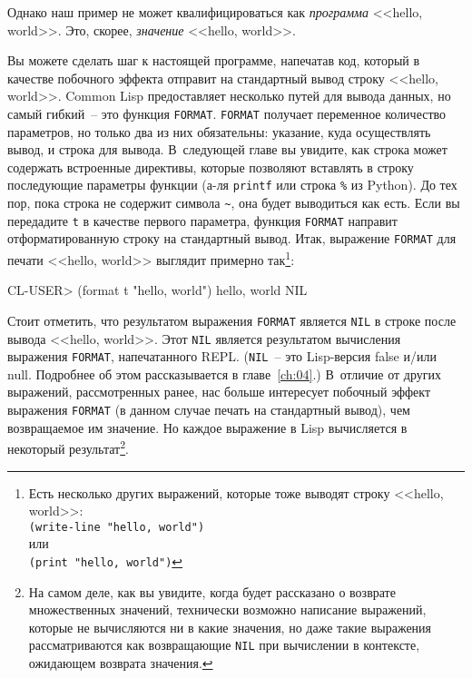 Однако наш пример не может квалифицироваться как \emph{программа} <<hello, world>>.
Это, скорее, \emph{значение} <<hello, world>>.

Вы можете сделать шаг к настоящей программе, напечатав код, который в качестве побочного
эффекта отправит на стандартный вывод строку <<hello, world>>. Common Lisp предоставляет
несколько путей для вывода данных, но самый гибкий~-- это функция \lstinline{FORMAT}. \lstinline{FORMAT} получает
переменное количество параметров, но только два из них обязательны: указание, куда
осуществлять вывод, и строка для вывода. В~следующей главе вы увидите, как строка может
содержать встроенные директивы, которые позволяют вставлять в строку последующие параметры
функции (а-ля \lstinline{printf} или строка \lstinline|%| из Python). До тех пор, пока строка
не содержит символа \lstinline|~|, она будет выводиться как есть. Если вы передадите \texttt{t} в
качестве первого параметра, функция \lstinline{FORMAT} направит отформатированную строку на
стандартный вывод. Итак, выражение \lstinline{FORMAT} для печати <<hello, world>> выглядит примерно
так\footnote{Есть несколько других выражений, которые тоже выводят строку <<hello, world>>:\\
  \lstinline{(write-line "hello, world")} \\
  или \\
  \lstinline{(print "hello, world")}}:

\begin{myverb}
CL-USER> (format t "hello, world")
hello, world
NIL
\end{myverb}

Стоит отметить, что результатом выражения \lstinline{FORMAT} является \lstinline{NIL} в строке после
вывода <<hello, world>>. Этот \lstinline{NIL} является результатом вычисления выражения \lstinline{FORMAT},
напечатанного REPL. (\lstinline{NIL}~-- это Lisp-версия false и/или null. Подробнее об этом
рассказывается в главе~\ref{ch:04}.) В~отличие от других выражений, рассмотренных ранее, нас больше
интересует побочный эффект выражения \lstinline{FORMAT} (в данном случае печать на стандартный
вывод), чем возвращаемое им значение. Но каждое выражение в Lisp вычисляется в некоторый
результат\footnote{На самом деле, как вы увидите, когда будет рассказано о возврате
  множественных значений, технически возможно написание выражений, которые не вычисляются
  ни в какие значения, но даже такие выражения рассматриваются как возвращающие \lstinline{NIL} при
  вычислении в контексте, ожидающем возврата значения.}.

